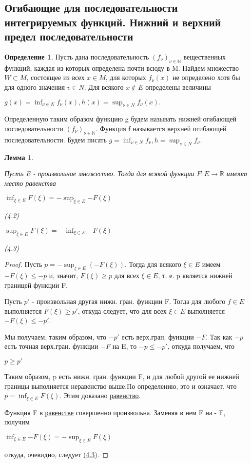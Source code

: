 \documentclass[a4paper]{article}
\newtheorem{lemma}{Лемма}[section]
\theoremstyle{definition}
\newtheorem*{definition}{Определение}
\theoremstyle{remark}
\begin{document}
    \subsection{Огибающие для последовательности интегрируемых функций. Нижний и верхний предел последовательности}
     \begin{definition}
          Пусть дана последовательность $(f_\nu)_{\nu\in \mathbb{N}}$ вещественных функций, 
          каждая из которых определена почти всюду в M. Найдем множество 
          $W \subset M$, состоящее из всех $x \in M$, для которых $f_\nu(x)$ не определено 
          хотя бы для одного значения $v \in N$. Для всякого $x \notin E$ определены 
          величины 

          $g(x) = \inf_{\nu \in N}{f_\nu(x)}, h(x) =\sup_{\nu \in N}{f_\nu(x)}.$ 

          Определенную таким образом функцию g будем называть нижней 
          огибающей последовательности $(f_\nu)_{\nu\in \mathbb{N}}$. Функция f называется  
          верхней огибающей последовательности. Будем писать 
          $g = \inf_{\nu \in N}{f_\nu}, h =\sup_{\nu \in N}{f_\nu}.$ 
     \end{definition}
     \begin{lemma} \hypertarget{l4.2}{}
          Пусть E - произвольное множество. Тогда для  
          всякой функции $F: E \to \mathbb{R}$ имеют место равенства

          \hypertarget{4.2}{$\inf_{\xi \in E}{F(\xi)} = -\sup_{\xi \in E}{-F(\xi)}$ } (4.2)

          \hypertarget{4.3}{$\sup_{\xi \in E}{F(\xi)} = -\inf_{\xi \in E}{-F(\xi)}$ } (4.3)
     \end{lemma}
     \begin{proof}
          Пусть $p = - \sup_{\xi \in E}(-F(\xi))$. Тогда для всякого 
          $\xi \in E$ имеем $-F(\xi) \leq -p$ и, значит, $F(\xi) \geq p$ для всех $\xi \in E$, т. е. 
          p является нижней границей функции F. 

          Пусть $p'$ - произвольная другая нижн. гран. функции F.  
          Тогда для любого $f \in E$ выполняется $F(\xi) \geq p'$, откуда следует, что для 
          всех $\xi \in E$ выполняется $-F(\xi) \leq -p'$.

          Мы получаем, таким образом, что $-p'$ есть верх.гран.  
          функции $-F$. Так как $-p$ есть точная верх.гран. функции $-F$ на E, 
          то $-p \leq -p'$, откуда получаем, что 

          \hypertarget{4.4}{$p \geq p'$}

          Таким образом, p есть нижн. гран. функции F, и для любой 
          другой ее нижней границы выполняется неравенство выше.По  
          определению, это и означает, что $p = \inf_{\xi \in E} F(\xi)$. 
          Этим доказано \hyperlink{4.2}{равенство}.

          Функция F в \hyperlink{4.2}{равенстве} совершенно произвольна.
          Заменяя в нем 
          F на - F, получим 

          $\inf_{\xi \in E}{-F(\xi)} = - \sup_{\xi \in E}{F(\xi)}$

          откуда, очевидно, следует \hyperlink{4.3}{(4.3)}. 
     \end{proof}
\end{document}
